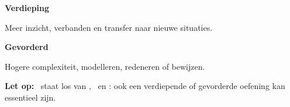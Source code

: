 \noindent
\begin{minipage}[t]{0.48\linewidth}

  \begin{minipage}[t]{14mm}
    \centering
    \oefU
  \end{minipage}%
  \hspace{2mm}%
  \begin{minipage}[t]{\dimexpr\linewidth-18mm\relax}

    \textbf{Verdieping}

    \vspace{1mm}

    \small
    Meer inzicht, verbanden en transfer naar nieuwe situaties.

  \end{minipage}

\end{minipage}%
\hfill
\begin{minipage}[t]{0.48\linewidth}

  \begin{minipage}[t]{14mm}
    \centering
    \oefG
  \end{minipage}%
  \hspace{2mm}%
  \begin{minipage}[t]{\dimexpr\linewidth-18mm\relax}

    \textbf{Gevorderd}

    \vspace{1mm}

    \small
    Hogere complexiteit, modelleren, redeneren of bewijzen.

  \end{minipage}

\end{minipage}



\vspace{5mm}

\noindent
\small
\textbf{Let op:}\quad
\ESSinline\ staat los van
\oefBinline, \oefUinline\ en \oefGinline:
ook een verdiepende of gevorderde oefening kan essentieel zijn.

\par
\medskip



